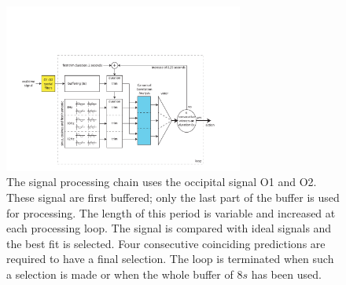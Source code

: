 \documentclass[smallextended]{svjour3}
\begin{document}
\begin{figure}
\center
\includegraphics[width=0.7\textwidth]{figures/schema-openvibe-cca.pdf}
\caption{The signal processing chain uses the occipital signal O1 and O2. These signal are first buffered; only the last part of the buffer is used for processing. The length of this period is variable and increased at each processing loop. The signal is compared with ideal signals and the best fit is selected. Four consecutive coinciding predictions are required to have a final selection. The loop is terminated when such a selection is made or when the whole buffer of 8$s$ has been used.}
\label{fig:schema-openvibe-cca}
\end{figure}
\end{document}
